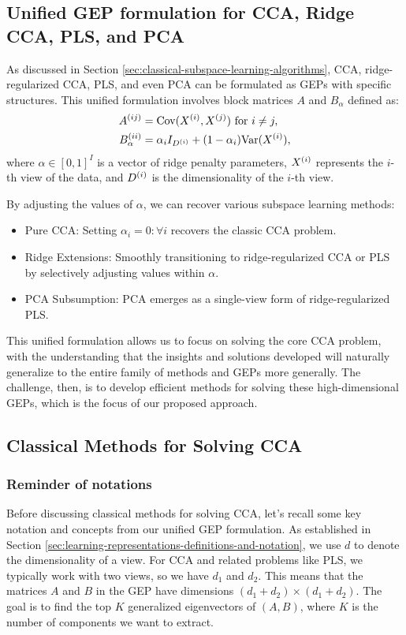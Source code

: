 \subsection{Unified GEP formulation for CCA, Ridge CCA, PLS, and PCA}
As discussed in Section \ref{sec:classical-subspace-learning-algorithms}, CCA, ridge-regularized CCA, PLS, and even PCA can be formulated as GEPs with specific structures. This unified formulation involves block matrices $A$ and $B_\alpha$ defined as:
\begin{align}
A^{(ij)} &= \mathrm{Cov}(X^{(i)}, X^{(j)}) \text{ for } i \neq j, \\
B_\alpha^{(ii)} &= \alpha_i I_{D^{(i)}} + (1-\alpha_i) \mathrm{Var}(X^{(i)}),
\end{align}
where $\alpha \in [0,1]^I$ is a vector of ridge penalty parameters, $X^{(i)}$ represents the $i$-th view of the data, and $D^{(i)}$ is the dimensionality of the $i$-th view.

By adjusting the values of $\alpha$, we can recover various subspace learning methods:

\begin{itemize}
    \item Pure CCA: Setting $\alpha_i = 0 : \forall i$ recovers the classic CCA problem.
    \item Ridge Extensions: Smoothly transitioning to ridge-regularized CCA or PLS by selectively adjusting values within $\alpha$.
    \item PCA Subsumption: PCA emerges as a single-view form of ridge-regularized PLS.
\end{itemize}

This unified formulation allows us to focus on solving the core CCA problem, with the understanding that the insights and solutions developed will naturally generalize to the entire family of methods and GEPs more generally. The challenge, then, is to develop efficient methods for solving these high-dimensional GEPs, which is the focus of our proposed approach.

\subsection{Classical Methods for Solving CCA}

\subsubsection{Reminder of notations}

Before discussing classical methods for solving CCA, let's recall some key notation and concepts from our unified GEP formulation. As established in Section \ref{sec:learning-representations-definitions-and-notation}, we use $d$ to denote the dimensionality of a view. For CCA and related problems like PLS, we typically work with two views, so we have $d_1$ and $d_2$.
This means that the matrices $A$ and $B$ in the GEP have dimensions $(d_1 + d_2) \times (d_1 + d_2)$. The goal is to find the top $K$ generalized eigenvectors of $(A, B)$, where $K$ is the number of components we want to extract.

